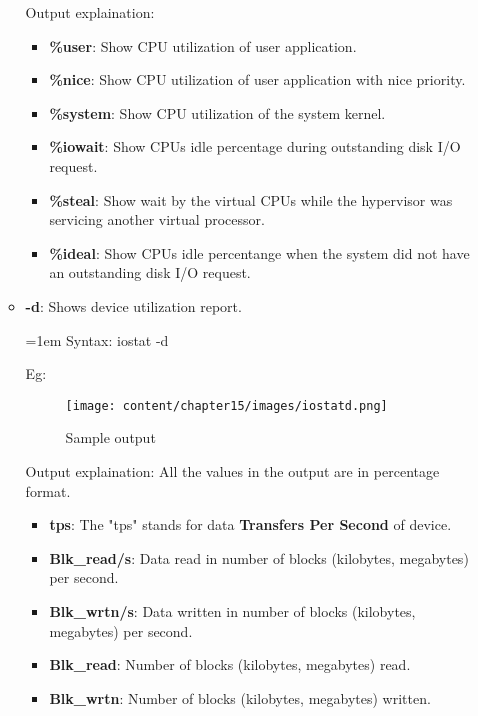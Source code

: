 \begin{flushleft}
\begin{itemize}
\begin{itemize}
		Output explaination:
		\begin{itemize}
			\item \textbf{\%user}: Show CPU utilization of user application.
			\item \textbf{\%nice}: Show CPU utilization of user application with nice priority.
			\item \textbf{\%system}: Show CPU utilization of the system kernel.
			\item \textbf{\%iowait}: Show CPUs idle percentage during outstanding disk I/O request.
			\item \textbf{\%steal}: Show wait by the virtual CPUs while the hypervisor was servicing another virtual processor.
			\item \textbf{\%ideal}: Show CPUs idle percentange when the	system did not have an outstanding disk I/O request.
		\end{itemize}
	\newpage
		\item \textbf{-d}: Shows device utilization report.
		\newline
		\begin{tcolorbox}[breakable,notitle,boxrule=0pt,colback=pink,colframe=pink]
			\color{black}
			\font=1em
			Syntax: iostat -d
			\font=4pt
		\end{tcolorbox}
		Eg:
		\begin{figure}[h!]
			\centering
			\texttt{[image: content/chapter15/images/iostatd.png]}
			\caption{Sample output}
			\label{fig:output2}
		\end{figure}
		\newline
		Output explaination:
		\newline
		All the values in the output are in percentage format.
		\begin{itemize}
			\item \textbf{tps}: The "tps" stands for data \textbf{Transfers Per Second} of device.
			\item \textbf{Blk\_read/s}: Data read in number of blocks (kilobytes, megabytes) per second.
			\item \textbf{Blk\_wrtn/s}: Data written in number of blocks (kilobytes, megabytes) per second.
			\item \textbf{Blk\_read}: Number of blocks (kilobytes, megabytes) read.
			\item \textbf{Blk\_wrtn}: Number of blocks (kilobytes, megabytes) written.
		\end{itemize}
		

\end{itemize}
\end{itemize}
\end{flushleft}
